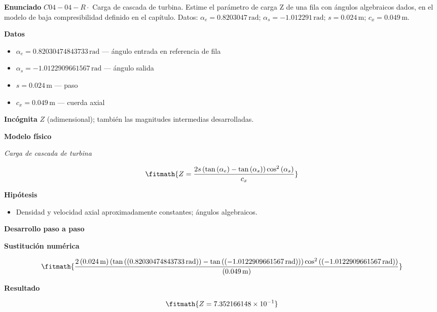 \documentclass[10pt,openany]{book}
\begin{document}
\begin{tcolorbox}[title={Problema resuelto 4}, studiumworked, breakable]

\noindent\textbf{Enunciado}
\(C04-04-R \cdot\) Carga de cascada de turbina. Estime el parámetro de carga Z de una fila con ángulos algebraicos dados, en el modelo de baja compresibilidad definido en el capítulo. Datos: \(\alpha_e=0.8203047\, \mathrm{rad}\); \(\alpha_s=-1.012291\, \mathrm{rad}\); \(s=0.024\, \mathrm{m}\); \(c_x=0.049\, \mathrm{m}\).

\noindent\textbf{Datos}
\begin{itemize}
\item $\alpha_e = 0.82030474843733\,\mathrm{rad}$ — ángulo entrada en referencia de fila
\item $\alpha_s = -1.0122909661567\,\mathrm{rad}$ — ángulo salida
\item $s = 0.024\,\mathrm{m}$ — paso
\item $c_x = 0.049\,\mathrm{m}$ — cuerda axial
\end{itemize}

\noindent\textbf{Incógnita}
$Z$ (adimensional); también las magnitudes intermedias desarrolladas.

\noindent\textbf{Modelo físico}

\noindent\textit{Carga de cascada de turbina}

\[
\fitmath{Z=\frac{2 s \left(\tan{\left(\alpha_e \right)} - \tan{\left(\alpha_s \right)}\right) \cos^{2}{\left(\alpha_s \right)}}{c_x}}
\]

\noindent\textbf{Hipótesis}
\begin{itemize}
\item Densidad y velocidad axial aproximadamente constantes; ángulos algebraicos.
\end{itemize}

\noindent\textbf{Desarrollo paso a paso}



\noindent\textbf{Sustitución numérica}

\[
\fitmath{\frac{2 \left(0.024\,\mathrm{m}\right) \left(\tan{\left(\left(0.82030474843733\,\mathrm{rad}\right) \right)} - \tan{\left(\left(-1.0122909661567\,\mathrm{rad}\right) \right)}\right) \cos^{2}{\left(\left(-1.0122909661567\,\mathrm{rad}\right) \right)}}{\left(0.049\,\mathrm{m}\right)}}
\]

\noindent\textbf{Resultado}

\[
\fitmath{Z=7.352166148\times10^{-1}}
\]


\end{tcolorbox}
\end{document}
